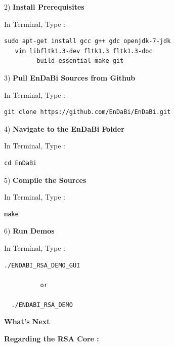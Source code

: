 \documentclass{slides}
\begin{document}
\begin{center}
2) \textbf{Install Prerequisites}
\begin{center}
In Terminal, Type :
\end{center}
\begin{BVerbatim}
sudo apt-get install gcc g++ gdc openjdk-7-jdk
   vim libfltk1.3-dev fltk1.3 fltk1.3-doc
         build-essential make git 
\end{BVerbatim}
\end{center}
\begin{center}
3) \textbf{Pull EnDaBi Sources from Github}
\begin{center}
In Terminal, Type :
\end{center}
\begin{BVerbatim}
git clone https://github.com/EnDaBi/EnDaBi.git
\end{BVerbatim}
\end{center}
\newpage
\begin{center}
4) \textbf{Navigate to the EnDaBi Folder}
\begin{center}
In Terminal, Type :
\end{center}
\begin{BVerbatim}
cd EnDaBi
\end{BVerbatim}
\end{center}
\begin{center}
5) \textbf{Compile the Sources}
\begin{center}
In Terminal, Type :
\end{center}
\begin{BVerbatim}
make
\end{BVerbatim}
\end{center}
\begin{center}
6) \textbf{Run Demos}
\end{center}
\begin{center}
In Terminal, Type :
\end{center}
\begin{center}
\centering
\begin{BVerbatim}
./ENDABI_RSA_DEMO_GUI
          
          or
          
  ./ENDABI_RSA_DEMO
\end{BVerbatim}
\end{center}
\newpage
\begin{center}
\textbf{\Large What's Next}
\end{center}
\begin{center}
\textbf{Regarding the RSA Core :}
\end{center}
\end{document}
